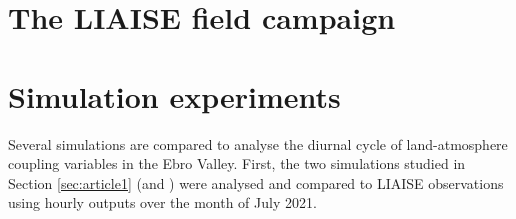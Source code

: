 \section{The LIAISE field campaign}

\section{Simulation experiments}

Several simulations are compared to analyse the diurnal cycle of land-atmosphere coupling variables in the Ebro Valley.
First, the two simulations studied in Section \ref{sec:article1} (\noirr and \irr) were analysed and compared to LIAISE observations using hourly outputs over the month of July 2021.


